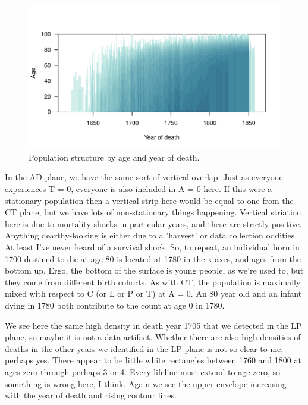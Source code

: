 \documentclass{bmcart}
\begin{document}
\begin{figure}
\includegraphics[scale=.9]{Figures/QuebecAD.pdf}
\caption{Population structure by age and year of death.}
\label{fig:adq}
\end{figure}
In the AD plane, we have the same sort of vertical overlap. Just as everyone experiences T = 0, everyone is also included in A = 0 here. If this were a stationary population then a vertical strip here would be equal to one from the CT plane, but we have lots of non-stationary things happening. Vertical striation here is due to mortality shocks in particular years, and these are strictly positive. Anything dearthy-looking is either due to a 'harvest' or data collection oddities. At least I've never heard of a survival shock. So, to repeat, an individual born in 1700 destined to die at age 80 is located at 1780 in the x axes, and ages from the bottom up. Ergo, the bottom of the surface is young people, as we're used to, but they come from different birth cohorts. As with CT, the population is maximally mixed with respect to C (or L or P or T) at A = 0. An 80 year old and an infant dying in 1780 both contribute to the count at age 0 in 1780.

We see here the same high density in death year 1705 that we detected in the LP plane, so maybe it is not a data artifact. Whether there are also high densities of deaths in the other years we identified in the LP plane is not so clear to me; perhaps yes. There appear to be little white rectangles between 1760 and 1800 at ages zero through perhaps 3 or 4. Every lifeline must extend to age zero, so something is wrong here, I think. Again we see the upper envelope increasing with the year of death and rising contour lines.

\FloatBarrier
\end{document}
